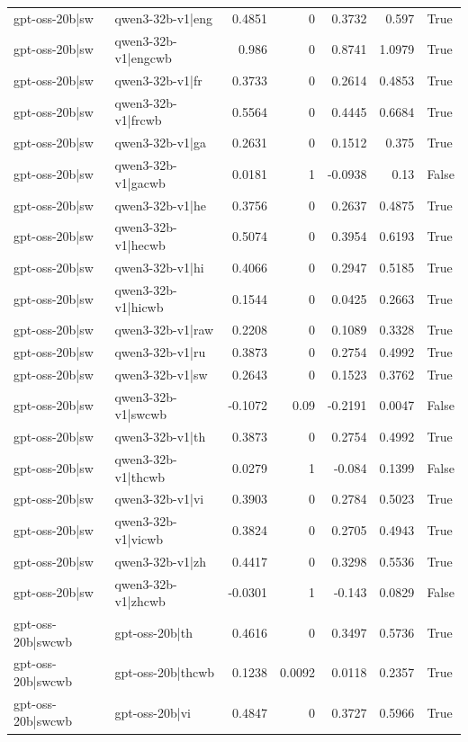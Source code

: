 \begin{table}
\begin{tabular}{l l r r r r l}
gpt-oss-20b|sw & qwen3-32b-v1|eng & 0.4851 & 0 & 0.3732 & 0.597 & True \\
gpt-oss-20b|sw & qwen3-32b-v1|engcwb & 0.986 & 0 & 0.8741 & 1.0979 & True \\
gpt-oss-20b|sw & qwen3-32b-v1|fr & 0.3733 & 0 & 0.2614 & 0.4853 & True \\
gpt-oss-20b|sw & qwen3-32b-v1|frcwb & 0.5564 & 0 & 0.4445 & 0.6684 & True \\
gpt-oss-20b|sw & qwen3-32b-v1|ga & 0.2631 & 0 & 0.1512 & 0.375 & True \\
gpt-oss-20b|sw & qwen3-32b-v1|gacwb & 0.0181 & 1 & -0.0938 & 0.13 & False \\
gpt-oss-20b|sw & qwen3-32b-v1|he & 0.3756 & 0 & 0.2637 & 0.4875 & True \\
gpt-oss-20b|sw & qwen3-32b-v1|hecwb & 0.5074 & 0 & 0.3954 & 0.6193 & True \\
gpt-oss-20b|sw & qwen3-32b-v1|hi & 0.4066 & 0 & 0.2947 & 0.5185 & True \\
gpt-oss-20b|sw & qwen3-32b-v1|hicwb & 0.1544 & 0 & 0.0425 & 0.2663 & True \\
gpt-oss-20b|sw & qwen3-32b-v1|raw & 0.2208 & 0 & 0.1089 & 0.3328 & True \\
gpt-oss-20b|sw & qwen3-32b-v1|ru & 0.3873 & 0 & 0.2754 & 0.4992 & True \\
gpt-oss-20b|sw & qwen3-32b-v1|sw & 0.2643 & 0 & 0.1523 & 0.3762 & True \\
gpt-oss-20b|sw & qwen3-32b-v1|swcwb & -0.1072 & 0.09 & -0.2191 & 0.0047 & False \\
gpt-oss-20b|sw & qwen3-32b-v1|th & 0.3873 & 0 & 0.2754 & 0.4992 & True \\
gpt-oss-20b|sw & qwen3-32b-v1|thcwb & 0.0279 & 1 & -0.084 & 0.1399 & False \\
gpt-oss-20b|sw & qwen3-32b-v1|vi & 0.3903 & 0 & 0.2784 & 0.5023 & True \\
gpt-oss-20b|sw & qwen3-32b-v1|vicwb & 0.3824 & 0 & 0.2705 & 0.4943 & True \\
gpt-oss-20b|sw & qwen3-32b-v1|zh & 0.4417 & 0 & 0.3298 & 0.5536 & True \\
gpt-oss-20b|sw & qwen3-32b-v1|zhcwb & -0.0301 & 1 & -0.143 & 0.0829 & False \\
gpt-oss-20b|swcwb & gpt-oss-20b|th & 0.4616 & 0 & 0.3497 & 0.5736 & True \\
gpt-oss-20b|swcwb & gpt-oss-20b|thcwb & 0.1238 & 0.0092 & 0.0118 & 0.2357 & True \\
gpt-oss-20b|swcwb & gpt-oss-20b|vi & 0.4847 & 0 & 0.3727 & 0.5966 & True \\

\end{tabular}
\end{table}
